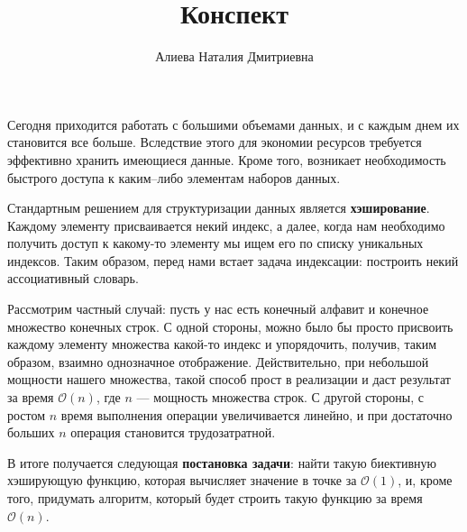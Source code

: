 \documentclass[specialist,
               substylefile = spbu.rtx,
               subf,href,colorlinks=true, 12pt]{disser}
\begin{document}


\title{Конспект}


\author{Алиева Наталия Дмитриевна}


\date{\number\year}

\maketitle

\tableofcontents

\intro

Сегодня приходится работать с большими объемами данных, и с каждым днем их становится все больше. Вследствие этого  для экономии ресурсов требуется эффективно хранить имеющиеся данные. Кроме того, возникает необходимость быстрого доступа к каким--либо элементам наборов данных.

Стандартным решением для структуризации данных является \textbf{хэширование}. Каждому элементу присваивается некий индекс, а далее, когда нам необходимо получить доступ к какому-то элементу мы ищем его по списку уникальных индексов. Таким образом, перед нами встает задача индексации: построить некий ассоциативный словарь. 

Рассмотрим частный случай: пусть у нас есть конечный алфавит и конечное множество конечных строк. С одной стороны, можно было бы просто присвоить каждому элементу множества какой-то индекс и упорядочить, получив, таким образом, взаимно однозначное отображение. Действительно, при небольшой мощности нашего множества, такой способ прост в реализации и даст результат за время $\mathcal{O}(n)$, где $n$ --- мощность множества строк. С другой стороны, с ростом $n$ время выполнения операции увеличивается линейно, и при достаточно больших $n$ операция становится трудозатратной.

В итоге получается следующая \textbf{постановка задачи}: найти такую биективную хэширующую функцию, которая вычисляет значение в точке за $\mathcal{O}(1)$, и, кроме того, придумать алгоритм, который будет строить такую функцию за время $\mathcal{O}(n)$. 
\end{document}
